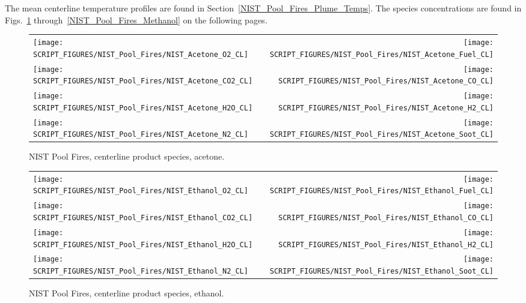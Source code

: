 The mean centerline temperature profiles are found in Section~\ref{NIST_Pool_Fires_Plume_Temps}. The species concentrations are found in Figs.~\ref{NIST_Pool_Fires_Acetone} through~\ref{NIST_Pool_Fires_Methanol} on the following pages.

\begin{figure}[p]
\begin{tabular*}{\textwidth}{l@{\extracolsep{\fill}}r}
\texttt{[image: SCRIPT\_FIGURES/NIST\_Pool\_Fires/NIST\_Acetone\_O2\_CL]} &
\texttt{[image: SCRIPT\_FIGURES/NIST\_Pool\_Fires/NIST\_Acetone\_Fuel\_CL]} \\
\texttt{[image: SCRIPT\_FIGURES/NIST\_Pool\_Fires/NIST\_Acetone\_CO2\_CL]} &
\texttt{[image: SCRIPT\_FIGURES/NIST\_Pool\_Fires/NIST\_Acetone\_CO\_CL]}    \\
\texttt{[image: SCRIPT\_FIGURES/NIST\_Pool\_Fires/NIST\_Acetone\_H2O\_CL]} &
\texttt{[image: SCRIPT\_FIGURES/NIST\_Pool\_Fires/NIST\_Acetone\_H2\_CL]} \\
\texttt{[image: SCRIPT\_FIGURES/NIST\_Pool\_Fires/NIST\_Acetone\_N2\_CL]} &
\texttt{[image: SCRIPT\_FIGURES/NIST\_Pool\_Fires/NIST\_Acetone\_Soot\_CL]}
\end{tabular*}
\caption[NIST Pool Fires, centerline product species, acetone]{NIST Pool Fires, centerline product species, acetone.}
\label{NIST_Pool_Fires_Acetone}
\end{figure}

\begin{figure}[p]
\begin{tabular*}{\textwidth}{l@{\extracolsep{\fill}}r}
\texttt{[image: SCRIPT\_FIGURES/NIST\_Pool\_Fires/NIST\_Ethanol\_O2\_CL]} &
\texttt{[image: SCRIPT\_FIGURES/NIST\_Pool\_Fires/NIST\_Ethanol\_Fuel\_CL]} \\
\texttt{[image: SCRIPT\_FIGURES/NIST\_Pool\_Fires/NIST\_Ethanol\_CO2\_CL]} &
\texttt{[image: SCRIPT\_FIGURES/NIST\_Pool\_Fires/NIST\_Ethanol\_CO\_CL]}    \\
\texttt{[image: SCRIPT\_FIGURES/NIST\_Pool\_Fires/NIST\_Ethanol\_H2O\_CL]} &
\texttt{[image: SCRIPT\_FIGURES/NIST\_Pool\_Fires/NIST\_Ethanol\_H2\_CL]} \\
\texttt{[image: SCRIPT\_FIGURES/NIST\_Pool\_Fires/NIST\_Ethanol\_N2\_CL]} &
\texttt{[image: SCRIPT\_FIGURES/NIST\_Pool\_Fires/NIST\_Ethanol\_Soot\_CL]}
\end{tabular*}
\caption[NIST Pool Fires, centerline product species, ethanol]{NIST Pool Fires, centerline product species, ethanol.}
\label{NIST_Pool_Fires_Ethanol}
\end{figure}

